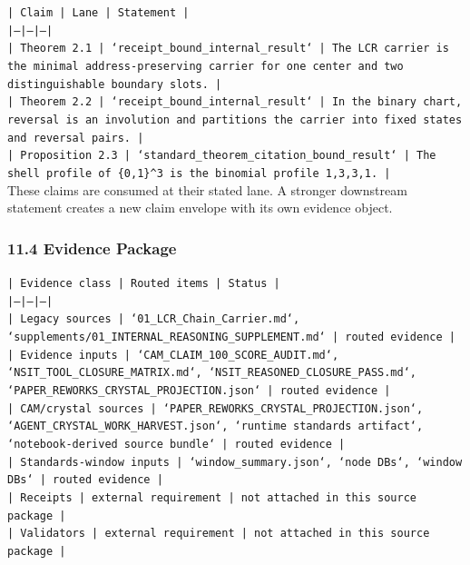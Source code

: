 \documentclass[11pt]{article}
\begin{document}
\noindent\texttt{| Claim | Lane | Statement |}\\
\noindent\texttt{|---|---|---|}\\
\noindent\texttt{| Theorem 2.1 | `receipt\_bound\_internal\_result` | The LCR carrier is the minimal address-preserving carrier for one center and two distinguishable boundary slots. |}\\
\noindent\texttt{| Theorem 2.2 | `receipt\_bound\_internal\_result` | In the binary chart, reversal is an involution and partitions the carrier into fixed states and reversal pairs. |}\\
\noindent\texttt{| Proposition 2.3 | `standard\_theorem\_citation\_bound\_result` | The shell profile of \{0,1\}\textasciicircum{}3 is the binomial profile 1,3,3,1. |}\\

These claims are consumed at their stated lane. A stronger downstream statement
creates a new claim envelope with its own evidence object.

\subsubsection*{11.4 Evidence Package}

\noindent\texttt{| Evidence class | Routed items | Status |}\\
\noindent\texttt{|---|---|---|}\\
\noindent\texttt{| Legacy sources | `01\_LCR\_Chain\_Carrier.md`, `supplements/01\_INTERNAL\_REASONING\_SUPPLEMENT.md` | routed evidence |}\\
\noindent\texttt{| Evidence inputs | `CAM\_CLAIM\_100\_SCORE\_AUDIT.md`, `NSIT\_TOOL\_CLOSURE\_MATRIX.md`, `NSIT\_REASONED\_CLOSURE\_PASS.md`, `PAPER\_REWORKS\_CRYSTAL\_PROJECTION.json` | routed evidence |}\\
\noindent\texttt{| CAM/crystal sources | `PAPER\_REWORKS\_CRYSTAL\_PROJECTION.json`, `AGENT\_CRYSTAL\_WORK\_HARVEST.json`, `runtime standards artifact`, `notebook-derived source bundle` | routed evidence |}\\
\noindent\texttt{| Standards-window inputs | `window\_summary.json`, `node DBs`, `window DBs` | routed evidence |}\\
\noindent\texttt{| Receipts | external requirement | not attached in this source package |}\\
\noindent\texttt{| Validators | external requirement | not attached in this source package |}\\
\end{document}
